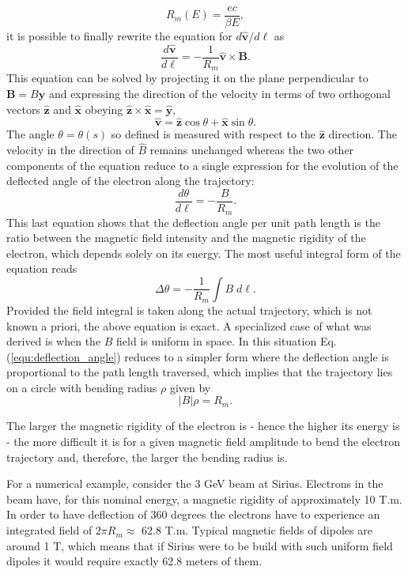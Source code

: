 \begin{equation}
R_m(E) = \frac{ec}{\beta E},
\end{equation}
it is possible to finally rewrite the equation for $d\bm{\hat{v}}/d\ell$ as 
\begin{equation}
\frac{d\bm{\hat{v}}}{d\ell} = -\frac{1}{R_m} \bm{\hat{v}} \times \bm{B}.
\end{equation}
This equation can be solved by projecting it on the plane perpendicular to $\bm{B} = B\bm{\hat{y}}$ and expressing the direction of the velocity in terms of two orthogonal vectors $\bm{\hat{z}}$ and $\bm{\hat{x}}$ obeying $\bm{\hat{z}} \times \bm{\hat{x}} = \bm{\hat{y}}$, 
\begin{equation}
\bm{\hat{v}} = \bm{\hat{z}} \cos \theta + \bm{\hat{x}} \sin \theta.
\end{equation} 
The angle $\theta = \theta(s)$ so defined is measured with respect to the $\bm{\hat{z}}$ direction. The velocity in the direction of $\hat{B}$ remains unchanged whereas the two other components of the equation reduce to a single expression for the evolution of the deflected angle of the electron along the trajectory:
\begin{equation}
\frac{d\theta}{d\ell}  = - \frac{B}{R_m}. 
\end{equation} 
This last equation shows that the deflection angle per unit path length is the ratio between the magnetic field intensity and the magnetic rigidity of the electron, which depends solely on its energy. The most useful integral form of the equation reads
\begin{equation}
\label{equ:deflection_angle}
\Delta \theta = - \frac{1}{R_m} \int{B \; d\ell}.
\end{equation} 
Provided the field integral is taken along the actual trajectory, which is not known a priori, the above equation is exact.
A specialized case of what was derived is when the $B$ field is uniform in space. In this situation Eq.(\ref{equ:deflection_angle}) reduces to a simpler form where the deflection angle is proportional to the path length traversed, which implies that the trajectory lies on a circle with bending radius $\rho$ given by
\begin{equation}
|B| \rho = {R_m}.
\end{equation} 

The larger the magnetic rigidity of the electron is - hence the higher its energy is - the more difficult it is for a given magnetic field amplitude to bend the electron trajectory and, therefore, the larger the bending radius is.

For a numerical example, consider the 3 GeV beam at Sirius. Electrons in the beam have, for this nominal energy, a magnetic rigidity of approximately 10 T.m. In order to have deflection of 360 degrees the electrons have to experience an integrated field of $2\pi R_m \approx$ 62.8 T.m. Typical magnetic fields of dipoles are around 1 T, which means that if Sirius were to be build with such uniform field dipoles it would require exactly 62.8 meters of them.